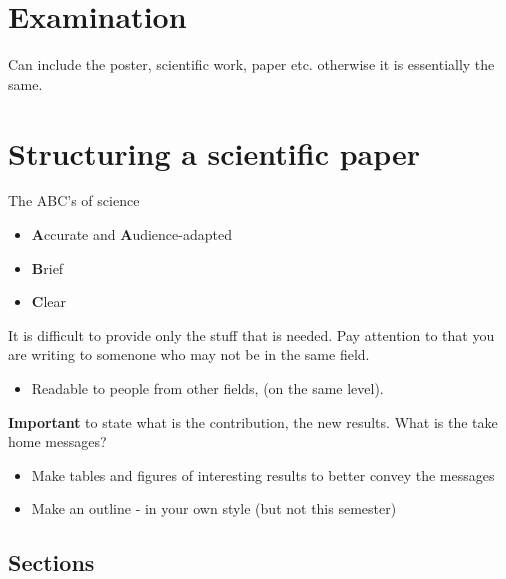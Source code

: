 \documentclass[a4paper]{article}
\begin{document}
\section{Examination}
Can include the poster, scientific work, paper etc. 
otherwise it is essentially the same.

\section{Structuring a scientific paper}
The ABC's of science

\begin{itemize}
	\item \textbf{A}ccurate and \textbf{A}udience-adapted  
	\item \textbf{B}rief 
	\item \textbf{C}lear 
\end{itemize}

It is difficult to provide only the stuff that is needed.
Pay attention to that you are writing to somenone who may not be in the same field. 
\begin{itemize}
	\item Readable to people from other fields, (on the same level).
\end{itemize}

\textbf{Important} to state what is the contribution, the new results. What is the take home messages? 

\begin{itemize}
	\item Make tables and figures of interesting results to better convey the messages
	\item Make an outline - in your own style (but not this semester)
\end{itemize}



\subsection{Sections}
\end{document}
